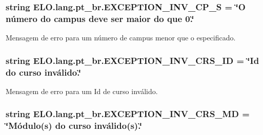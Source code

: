 \hypertarget{namespaceELO_1_1lang_1_1pt__br_a4ddcdc425d146648a599ef3a51370add}{
\subsubsection[{E\-X\-C\-E\-P\-T\-I\-O\-N\-\_\-\-I\-N\-V\-\_\-\-C\-P\-\_\-\-S}]{\setlength{\rightskip}{0pt plus 5cm}string E\-L\-O.\-lang.\-pt\-\_\-br.\-E\-X\-C\-E\-P\-T\-I\-O\-N\-\_\-\-I\-N\-V\-\_\-\-C\-P\-\_\-\-S = \char`\"{}O número do campus deve ser maior do que 0.\char`\"{}}}\label{d5/d70/namespaceELO_1_1lang_1_1pt__br_a4ddcdc425d146648a599ef3a51370add}


Mensagem de erro para um número de campus menor que o especificado. 

\hypertarget{namespaceELO_1_1lang_1_1pt__br_af6bf0e27741cb4f6fdbe17dc9ff26548}{
\subsubsection[{E\-X\-C\-E\-P\-T\-I\-O\-N\-\_\-\-I\-N\-V\-\_\-\-C\-R\-S\-\_\-\-I\-D}]{\setlength{\rightskip}{0pt plus 5cm}string E\-L\-O.\-lang.\-pt\-\_\-br.\-E\-X\-C\-E\-P\-T\-I\-O\-N\-\_\-\-I\-N\-V\-\_\-\-C\-R\-S\-\_\-\-I\-D = \char`\"{}Id do curso inválido.\char`\"{}}}\label{d5/d70/namespaceELO_1_1lang_1_1pt__br_af6bf0e27741cb4f6fdbe17dc9ff26548}


Mensagem de erro para um Id de curso inválido. 

\hypertarget{namespaceELO_1_1lang_1_1pt__br_a9c32313b0ed452ee5083fc52b6ba0709}{
\subsubsection[{E\-X\-C\-E\-P\-T\-I\-O\-N\-\_\-\-I\-N\-V\-\_\-\-C\-R\-S\-\_\-\-M\-D}]{\setlength{\rightskip}{0pt plus 5cm}string E\-L\-O.\-lang.\-pt\-\_\-br.\-E\-X\-C\-E\-P\-T\-I\-O\-N\-\_\-\-I\-N\-V\-\_\-\-C\-R\-S\-\_\-\-M\-D = \char`\"{}Módulo(s) do curso inválido(s).\char`\"{}}}\label{d5/d70/namespaceELO_1_1lang_1_1pt__br_a9c32313b0ed452ee5083fc52b6ba0709}


